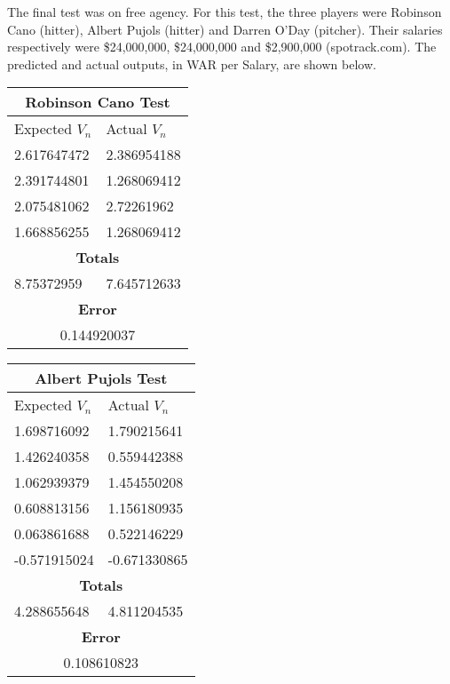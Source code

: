\documentclass[12pt]{article}
\begin{document}
The final test was on free agency.  For this test, the three players were Robinson Cano (hitter), Albert Pujols (hitter) and Darren O'Day (pitcher).  Their salaries respectively were \$24,000,000, \$24,000,000 and \$2,900,000 (spotrack.com).  The predicted and actual outputs, in WAR per Salary, are shown below. \\
\begin{center}
\begin{tabular}{ |p{2.5cm}||p{2cm}|  }
\hline
\multicolumn{2}{|c|}{Robinson Cano Test} \\
\hline
Expected $V_n$ & Actual $V_n$ \\
\hline
 2.617647472 & 2.386954188   \\
\hline
2.391744801 &   1.268069412 \\
\hline
2.075481062 & 2.72261962  \\
\hline
1.668856255  & 1.268069412  \\
\hline
 \multicolumn{2}{|c|}{\textbf{Totals}} \\
 \hline
 8.75372959 & 7.645712633 \\
 \hline
 \multicolumn{2}{|c|}{\textbf{Error}} \\
 \hline
  \multicolumn{2}{|c|}{0.144920037} \\
 \hline
 \end{tabular}
\quad
\begin{tabular}{ |p{2.4cm}||p{2.5cm}|  }
\hline
\multicolumn{2}{|c|}{Albert Pujols Test} \\
\hline
Expected $V_n$ & Actual $V_n$ \\
\hline
 1.698716092 & 1.790215641   \\
\hline
1.426240358 &   0.559442388 \\
\hline
1.062939379 & 1.454550208  \\
\hline
0.608813156  & 1.156180935  \\
\hline
0.063861688 & 0.522146229  \\
 \hline
 -0.571915024 & -0.671330865  \\
 \hline
 \multicolumn{2}{|c|}{\textbf{Totals}} \\
 \hline
 4.288655648 & 4.811204535 \\
 \hline
 \multicolumn{2}{|c|}{\textbf{Error}} \\
 \hline
  \multicolumn{2}{|c|}{0.108610823} \\
 \hline
 \end{tabular}
\quad
\begin{tabular}{ |p{2.5cm}||p{2cm}|  }
\hline

\end{tabular}
\end{center}
\end{document}
